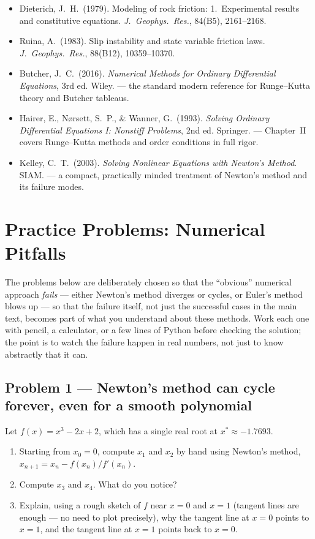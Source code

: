 \begin{itemize}
\item Dieterich, J.\ H.\ (1979). Modeling of rock friction: 1.\ Experimental results and constitutive equations. \emph{J.\ Geophys.\ Res.}, 84(B5), 2161--2168.
\item Ruina, A.\ (1983). Slip instability and state variable friction laws. \emph{J.\ Geophys.\ Res.}, 88(B12), 10359--10370.
\item Butcher, J.\ C.\ (2016). \emph{Numerical Methods for Ordinary Differential Equations}, 3rd ed. Wiley. --- the standard modern reference for Runge--Kutta theory and Butcher tableaus.
\item Hairer, E., N{\o}rsett, S.\ P., \& Wanner, G.\ (1993). \emph{Solving Ordinary Differential Equations I: Nonstiff Problems}, 2nd ed. Springer. --- Chapter~II covers Runge--Kutta methods and order conditions in full rigor.
\item Kelley, C.\ T.\ (2003). \emph{Solving Nonlinear Equations with Newton's Method}. SIAM. --- a compact, practically minded treatment of Newton's method and its failure modes.
\end{itemize}

\section{Practice Problems: Numerical Pitfalls}

The problems below are deliberately chosen so that the ``obvious'' numerical
approach \emph{fails} --- either Newton's method diverges or cycles, or
Euler's method blows up --- so that the failure itself, not just the
successful cases in the main text, becomes part of what you understand
about these methods. Work each one with pencil, a calculator, or a few
lines of Python before checking the solution; the point is to watch the
failure happen in real numbers, not just to know abstractly that it can.


\subsection*{Problem 1 --- Newton's method can cycle forever, even for a smooth polynomial}

Let $f(x) = x^3 - 2x + 2$, which has a single real root at $x^\ast \approx -1.7693$.

\begin{enumerate}[label=(\alph*)]
\item Starting from $x_0 = 0$, compute $x_1$ and $x_2$ by hand using Newton's method, $x_{n+1} = x_n - f(x_n)/f'(x_n)$.
\item Compute $x_3$ and $x_4$. What do you notice?
\item Explain, using a rough sketch of $f$ near $x=0$ and $x=1$ (tangent lines are enough --- no need to plot precisely), why the tangent line at $x=0$ points to $x=1$, and the tangent line at $x=1$ points back to $x=0$.
\end{enumerate}

